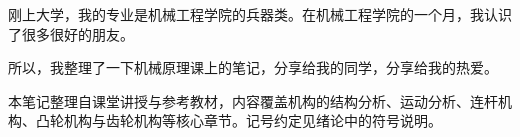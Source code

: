 刚上大学，我的专业是机械工程学院的兵器类。在机械工程学院的一个月，我认识了很多很好的朋友。

所以，我整理了一下机械原理课上的笔记，分享给我的同学，分享给我的热爱。

本笔记整理自课堂讲授与参考教材，内容覆盖机构的结构分析、运动分析、连杆机构、凸轮机构与齿轮机构等核心章节。记号约定见绪论中的符号说明。
